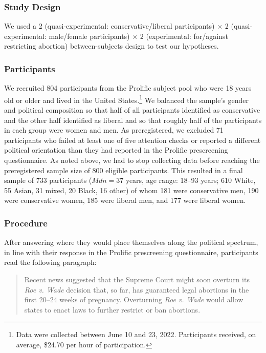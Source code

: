 \documentclass[12pt, letterpaper]{article}
\begin{document}
\hypertarget{study-design-2}{%
\subsubsection{Study Design}\label{study-design-2}}

We used a 2 (quasi-experimental: conservative/liberal participants)
\(\times\) 2 (quasi-experimental: male/female participants) \(\times\) 2
(experimental: for/against restricting abortion) between-subjects design
to test our hypotheses.

\hypertarget{participants-2}{%
\subsubsection{Participants}\label{participants-2}}

We recruited 804 participants from the Prolific subject pool who were 18
years old or older and lived in the United States.\footnote{Data were
  collected between June 10 and 23, 2022. Participants received, on
  average, \$24.70 per hour of participation.} We balanced the sample's
gender and political composition so that half of all participants
identified as conservative and the other half identified as liberal and
so that roughly half of the participants in each group were women and
men. As preregistered, we excluded 71 participants who failed at least
one of five attention checks or reported a different political
orientation than they had reported in the Prolific prescreening
questionnaire. As noted above, we had to stop collecting data before
reaching the preregistered sample size of 800 eligible participants.
This resulted in a final sample of 733 participants
(\(\textit{Mdn} = 37\) years, age range: 18--93 years; 610 White, 55
Asian, 31 mixed, 20 Black, 16 other) of whom 181 were conservative men,
190 were conservative women, 185 were liberal men, and 177 were liberal
women.

\hypertarget{procedure-2}{%
\subsubsection{Procedure}\label{procedure-2}}

After answering where they would place themselves along the political
spectrum, in line with their response in the Prolific prescreening
questionnaire, participants read the following paragraph:

\begin{quote}
Recent news suggested that the Supreme Court might soon overturn its
\emph{Roe v. Wade} decision that, so far, has guaranteed legal abortions
in the first 20--24 weeks of pregnancy. Overturning \emph{Roe v. Wade}
would allow states to enact laws to further restrict or ban abortions.
\end{quote}
\end{document}
